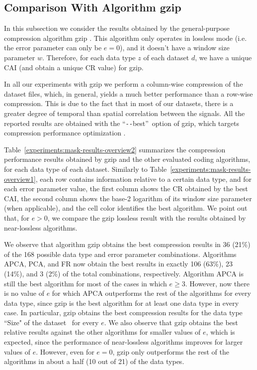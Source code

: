 
\subsection{Comparison With Algorithm gzip}
\label{secX:gzip}


\newcommand{\bestdash}{``\texttt{-{}-}best''}
In this subsection we consider the results obtained by the general-purpose compression algorithm gzip \cite{gzip}. This algorithm only operates in lossless mode (i.e. the error parameter can only be $e=0$), and it doesn't have a window size parameter $w$. Therefore, for each data type $z$ of each dataset $d$, we have a unique CAI (and obtain a unique CR value) for gzip. 

In all our experiments with gzip we perform a column-wise compression of the dataset files, which, in general, yields a much better performance than a row-wise compression. This is due to the fact that in most of our datasets, there is a greater degree of temporal than spatial correlation between the signals. All the reported results are obtained with the \bestdash\ option of gzip, which targets compression performance optimization \cite{gzipman}. 


Table~\ref{experiments:mask-results-overview2} summarizes the compression performance results obtained by gzip and the other evaluated coding algorithms, for each data type of each dataset. Similarly to Table~\ref{experiments:mask-results-overview1}, each row contains information relative to a certain data type, and for each error parameter value, the first column shows the CR obtained by the best CAI, the second column shows the base-2 logarithm of its window size parameter (when applicable), and the cell color identifies the best algorithm. We point out that, for $e > 0$, we compare the gzip lossless result with the results obtained by near-lossless algorithms.


We observe that algorithm gzip obtains the best compression results in 36 (21\%) of the 168 possible data type and error parameter combinations. Algorithms APCA, PCA, and FR now obtain the best results in exactly 106 (63\%), 23 (14\%), and 3 (2\%) of the total combinations, respectively. Algorithm APCA is still the best algorithm for most of the cases in which $e \geq 3$. However, now there is no value of $e$ for which APCA outperforms the rest of the algorithms for every data type, since gzip is the best algorithm for at least one data type in every case. In particular, gzip obtains the best compression results for the data type ``Size" of the dataset \datasethail\ for every $e$. We also observe that gzip obtains the best relative results against the other algorithms for smaller values of $e$, which is expected, since the performance of near-lossless algorithms improves for larger values of $e$. However, even for $e=0$, gzip only outperforms the rest of the algorithms in about a half (10 out of 21) of the data types.


